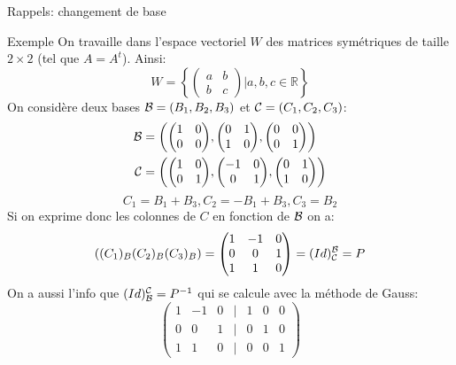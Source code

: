 \begin{parag}{Rappels: changement de base}
    \begin{subparag}{Exemple}
        On travaille dans l'espace vectoriel $W$ des matrices symétriques de taille $2 \times 2$ (tel que $A = A^t$). Ainsi:
        \[W = \left\{ \begin{pmatrix}
            a & b \\ b & c
        \end{pmatrix}| a, b, c \in \mathbb{R} \right\}\]
        On considère deux bases $\mathcal{B} = (B_1, B_2, B_3)$ et $\mathcal{C} = (C_1, C_2, C_3)$:
        \begin{align*}
            \bmath &= \left(\begin{pmatrix}
                1 & 0 \\ 0 & 0
            \end{pmatrix}, \begin{pmatrix}
                0 & 1 \\ 1 & 0
            \end{pmatrix}, \begin{pmatrix}
                0 & 0 \\ 0 & 1
            \end{pmatrix}\textbf{}\right) \\
            \cmath &= \left(\begin{pmatrix}
                1 & 0 \\0 & 1
            \end{pmatrix}, \begin{pmatrix}
                -1 & 0 \\ 0 & 1
            \end{pmatrix}, \begin{pmatrix}
                0 & 1 \\ 1 & 0
            \end{pmatrix}\right)
        \end{align*}
        \[C_1 = B_1 + B_3, C_2 = -B_1 +B_3 , C_3 = B_2 \]
        Si on exprime donc les colonnes de $C$ en fonction de $\mathcal{B}$ on a:
        \[\left((C_1)_B (C_2)_B (C_3)_B \right) = \begin{pmatrix}
            1 & -1 & 0 \\
            0 & 0 & 1\\
            1 & 1 & 0
        \end{pmatrix} = (Id)_\cmath^\bmath = P\]
        On a aussi l'info que $(Id)_{\mathcal{B}}^{\mathcal{C}} = P^{-1}$ qui se calcule avec la méthode de Gauss:
        \[\begin{pmatrix}
            1 & -1 & 0 & | & 1  & 0 & 0\\
            0 & 0 & 1 & | & 0 & 1 & 0 \\
            1 & 1 & 0 & | & 0 & 0 & 1
        \end{pmatrix}\]
    
    \end{subparag}
\end{parag}


